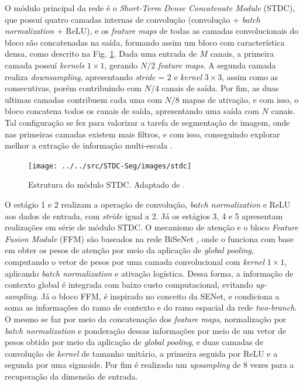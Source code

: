 \documentclass[conference]{IEEEtran}
\begin{document}
O módulo principal da rede é o \textit{Short-Term Dense Concatenate Module} (STDC), que possuí quatro camadas internas de convolução (convolução + \textit{batch normalization} + ReLU), e os \textit{feature maps} de todas as camadas convolucionais do bloco são concatenadas na saída, formando assim um bloco com característica densa, como descrito na Fig. \ref{fig:stdc}. Dada uma entrada de $M$ canais, a primeira camada possuí \textit{kernels} $1 \times 1$, gerando $N/2$ \textit{feature maps}. A segunda camada realiza \textit{downsampling}, apresentando \textit{stride} = 2 e \textit{kernel} $3 \times 3$, assim como as consecutivas, porém contribuindo com $N/4$ canais de saída. Por fim, as duas ultimas camadas contribuem cada uma com $N/8$ mapas de ativação, e com isso, o bloco concatena todos os canais de saída, apresentando uma saída com $N$ canais. Tal configuração se fez para valorizar a tarefa de segmentação de imagem, onde nas primeiras camadas existem mais filtros, e com isso, conseguindo explorar melhor a extração de informação multi-escala \cite{fan2021RethinkingBiSeNetRealtime}.

\begin{figure}[h!]
	\centering
	\texttt{[image: ../../src/STDC-Seg/images/stdc]}
	\caption{Estrutura do módulo STDC. Adaptado de \cite{fan2021RethinkingBiSeNetRealtime}.}
	\label{fig:stdc}
\end{figure}


O estágio 1 e 2 realizam a operação de convolução, \textit{batch normalization} e ReLU aos dados de entrada, com \textit{stride} igual a 2. Já os estágios 3, 4 e 5 apresentam realizações em série de módulo STDC. O mecanismo de atenção e o bloco \textit{Feature Fusion Module} (FFM) são baseados na rede BiSeNet \cite{yu2018BiSeNetBilateralSegmentation}, onde o funciona com base em obter os pesos de atenção por meio da aplicação de \textit{global pooling}, computando o vetor de pesos por uma camada convolucional com \textit{kernel} $1 \times 1$, aplicando \textit{batch normalization} e ativação logística. Dessa forma, a informação de contexto global é integrada com baixo custo computacional, evitando \textit{up-sampling}. Já o bloco FFM, é inspirado no conceito da SENet, e condiciona a soma as informações do ramo de contexto e do ramo espacial da rede \textit{two-branch}. O mesmo se faz por meio da concatenação dos \textit{feature maps}, normalização por \textit{batch normalization} e ponderação dessas informações por meio de um vetor de pesos obtido por meio da aplicação de \textit{global pooling}, e duas camadas de convolução de \textit{kernel} de tamanho unitário, a primeira seguida por ReLU e a segunda por uma sigmoide. Por fim é realizado um \textit{upsampling} de 8 vezes para a recuperação da dimensão de entrada.
\end{document}
